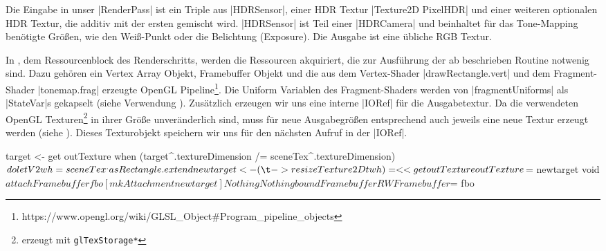 Die Eingabe in unser |RenderPass| ist ein Triple aus |HDRSensor|, einer HDR Textur |Texture2D PixelHDR| und einer weiteren optionalen HDR Textur, die additiv mit der ersten gemischt wird. |HDRSensor| ist Teil einer |HDRCamera| und beinhaltet für das Tone-Mapping benötigte Größen, wie den Weiß-Punkt oder die Belichtung (Exposure). Die Ausgabe ist eine übliche RGB Textur.


In , dem Ressourcenblock des Renderschritts, werden die Ressourcen akquiriert, die zur Ausführung der ab  beschrieben Routine notwenig sind. Dazu gehören ein Vertex Array Objekt, Framebuffer Objekt und die aus dem Vertex-Shader |drawRectangle.vert| und dem Fragment-Shader |tonemap.frag| erzeugte OpenGL Pipeline\footnote{https://www.opengl.org/wiki/GLSL\_Object\#Program\_pipeline\_objects}. Die Uniform Variablen des Fragment-Shaders werden von |fragmentUniforms| als |StateVar|s gekapselt (siehe Verwendung ). Zusätzlich erzeugen wir uns eine interne |IORef| für die Ausgabetextur. Da die verwendeten OpenGL Texturen\footnote{erzeugt mit \texttt{glTexStorage*}} in ihrer Größe unveränderlich sind, muss für neue Ausgabegrößen entsprechend auch jeweils eine neue Textur erzeugt werden (siehe ). Dieses Texturobjekt speichern wir uns für den nächsten Aufruf in der |IORef|.

\begin{haskell}[label={lst:tonemap-pass-run-resize},caption={[ToneMapPass Größenanpassung des Framebuffers]\texttt{ToneMapPass} Größenanpassung des Framebuffers},nolol]
    target <- get outTexture
    when (target^.textureDimension /= sceneTex^.textureDimension) $ do
      let V2 w h = sceneTex^.asRectangle.extend
      newtarget <- (\t -> resizeTexture2D t w h) =<< get outTexture
      outTexture $= newtarget
      void $ attachFramebuffer fbo [mkAttachment newtarget] Nothing Nothing
    boundFramebuffer RWFramebuffer $= fbo
\end{haskell}

